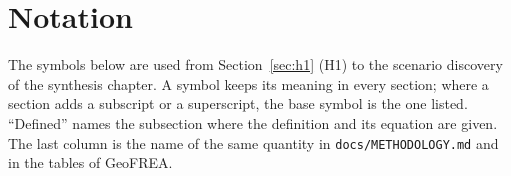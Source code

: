 
\section*{Notation}
\label{sec:notation}

The symbols below are used from Section~\ref{sec:h1} (H1) to the scenario
discovery of the synthesis chapter. A symbol keeps its meaning in every section;
where a section adds a subscript or a superscript, the base symbol is the one
listed. ``Defined'' names the subsection where the definition and its equation
are given. The last column is the name of the same quantity in
\texttt{docs/METHODOLOGY.md} and in the tables of GeoFREA.

